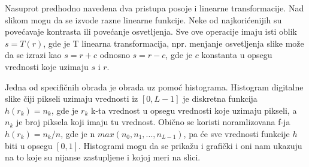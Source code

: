 \documentclass[a4paper,12pt,titlepage]{article}
\begin{document}
Nasuprot predhodno navedena dva pristupa posoje i linearne transformacije. Nad slikom mogu da se izvode razne linearne funkcije. Neke od najkorićenijih su povećavaje kontrasta ili povećanje osvetljenja. Sve ove operacije imaju isti oblik $s = T(r)$, gde je T linearna transformacija, npr. menjanje osvetljenja slike može da se izrazi kao $s = r + c$ odnosno $s = r - c$, gde je $c$ konstanta u opsegu vrednosti koje uzimaju $s$ i $r$. 

Jedna od specifičnih obrada je obrada uz pomoć histograma. Histogram digitalne slike čiji pikseli uzimaju vrednosti iz $[0, L - 1]$ je diskretna funkcija $h(r_{k}) = n_{k}$, gde je $r_{k}$ k-ta vrednost u opsegu vrednosti koje uzimaju pikseli, a $n_{k}$ je broj piksela koji imaju tu vrednost. Obično se koristi noramlizovana f-ja $h(r_{k}) = n_{k}/n$, gde je n $max(n_{0}, n_{1}, ... , n_{L - 1})$, pa će sve vrednosti funkcije $h$ biti u opsegu $[0, 1]$. Histogrami mogu da se prikažu i grafički i oni nam ukazuju na to koje su nijanse zastupljene i kojoj meri na slici.  
\end{document}
